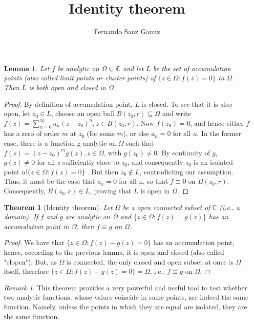 \documentclass[12pt]{article}
\newtheorem{thm}{Theorem}
\newtheorem{lem}{Lemma}
\theoremstyle{remark}
\newtheorem{rem}{Remark}
\numberwithin{equation}{section}
\begin{document}
\title{Identity theorem}%
\author{Fernando Sanz Gamiz}%

\begin{lem}
Let $f$ be analytic on $\Omega \subseteq \mathbb C$ and let $L$ be the set of
accumulation points (also called limit points or cluster points) of
$\{z \in \Omega \colon f(z)=0\}$ in $\Omega$. Then $L$ is both open
and closed in $\Omega$.
\end{lem}

\bigskip

\begin{proof}
By definition of accumulation point, $L$ is closed. To see that it
is also open, let $z_0 \in L$, choose an open ball $B(z_0, r)
\subseteq \Omega$ and write $f(z)=\sum_{n=0}^{\infty} a_n(z-z_0)^n,
z \in B(z_0, r)$. Now $f(z_0) = 0$, and hence either $f$ has a zero
of order $m$ at $z_0$ (for some $m$), or else $a_n = 0$ for all $n$.
In the former case, there is a function g analytic on $\Omega$  such
that $f(z)= (z-z_0)^m g(z), z \in \Omega$, with $g(z_0) \neq 0$. By
continuity of $g$, $g(z) \neq 0$ for all $z$ sufficiently close to
$z_0$, and consequently $z_0$ is an isolated point of$\{z \in \Omega
\colon f(z)=0\}$ . But then $z_0 \notin L$, contradicting our
assumption. Thus, it must be the case that $a_n = 0$ for all n, so
that $f \equiv 0$ on $B(z_0, r)$. Consequently, $B(z_0, r) \in L$,
proving that $L$ is open in $\Omega$.
\end{proof}

\bigskip

\begin{thm}[Identity theorem]
Let $\Omega$ be a open connected subset of $\mathbb C$ (i.e., a domain). If $f$ and
$g$ are analytic on $\Omega$ and $\{z \in \Omega \colon f(z)=g(z)\}$
has an accumulation point in $\Omega$, then $f \equiv g$ on
$\Omega$.
\end{thm}

\bigskip

\begin{proof}
We have that $\{z \in \Omega \colon f(z)-g(z)=0\}$ has an
accumulation point, hence, according to the previous lemma, it is
open and closed (also called "clopen"). But, as $\Omega$ is
connected, the only closed and open subset at once is $\Omega$
itself, therefore $\{z \in \Omega \colon f(z)-g(z)=0\}=\Omega$,
i.e., $f \equiv g$ on $\Omega$.
\end{proof}

\bigskip

\begin{rem}
This theorem provides a very powerful and useful tool to test
whether two analytic functions, whose values coincide in some
points, are indeed the same function. Namely, unless the points in
which they are equal are isolated, they are the same function.
\end{rem}

\end{document}
